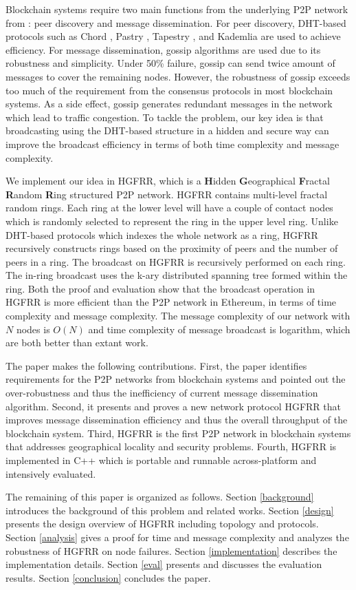 Blockchain systems require two main functions from the underlying P2P network from : peer discovery and message dissemination. For peer discovery, DHT-based protocols such as Chord \cite{stoica2001chord}, Pastry \cite{rowstron2001pastry}, Tapestry \cite{zhao2004tapestry}, and Kademlia \cite{maymounkov2002kademlia} are used to achieve efficiency. For message dissemination, gossip algorithms are used due to its robustness and simplicity. Under 50\% failure, gossip can send twice amount of messages to cover the remaining nodes. However, the robustness of gossip exceeds too much of the requirement from the consensus protocols in most blockchain systems. As a side effect, gossip generates redundant messages in the network which lead to traffic congestion. To tackle the problem, our key idea is that broadcasting using the DHT-based structure in a hidden and secure way can improve the broadcast efficiency in terms of both time complexity and message complexity.

We implement our idea in HGFRR, which is a \textbf{H}idden \textbf{G}eographical \textbf{F}ractal \textbf{R}andom \textbf{R}ing structured P2P network. HGFRR contains multi-level fractal random rings. Each ring at the lower level will have a couple of contact nodes which is randomly selected to represent the ring in the upper level ring. Unlike DHT-based protocols which indexes the whole network as a ring, HGFRR recursively constructs rings based on the proximity of peers and the number of peers in a ring. The broadcast on HGFRR is recursively performed on each ring. The in-ring broadcast uses the k-ary distributed spanning tree formed within the ring. Both the proof and evaluation show that the broadcast operation in HGFRR is more efficient than the P2P network in Ethereum, in terms of time complexity and message complexity. The message complexity of our network with $N$ nodes is $O(N)$ and time complexity of message broadcast is logarithm, which are both better than extant work.

The paper makes the following contributions. First, the paper identifies requirements for the P2P networks from blockchain systems and pointed out the over-robustness and thus the inefficiency of current message dissemination algorithm. Second, it presents and proves a new network protocol HGFRR that improves message dissemination efficiency and thus the overall throughput of the blockchain system. Third, HGFRR is the first P2P network in blockchain systems that addresses geographical locality and security problems. Fourth, HGFRR is implemented in C++ which is portable and runnable across-platform and intensively evaluated.

The remaining of this paper is organized as follows. Section \cref{background} introduces the background of this problem and related works. Section \cref{design} presents the design overview of HGFRR including topology and protocols. Section \cref{analysis} gives a proof for time and message complexity and analyzes the robustness of HGFRR on node failures. Section \cref{implementation} describes the implementation details. Section \cref{eval} presents and discusses the evaluation results. Section \cref{conclusion} concludes the paper.